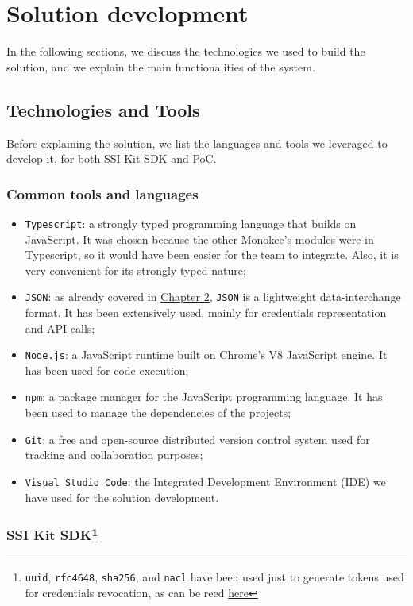 \clearpage
\section{Solution development}
In the following sections, we discuss the technologies we used to build the
solution, and we explain the main functionalities of the system.
\subsection{Technologies and Tools}
Before explaining the solution, we list the languages and tools we leveraged to develop it,
for both SSI Kit SDK and PoC.

\subsubsection{Common tools and languages}
\begin{itemize}
    \setlength\itemsep{-0.1em}
    \item \texttt{Typescript}: a strongly typed programming language that builds 
    on JavaScript. It was chosen because the other Monokee's modules were in 
    Typescript, so it would have been easier for the team to integrate. Also, it is 
    very convenient for its strongly typed nature;
    \item \texttt{JSON}: as already covered in \hyperref[subsubsec:json]{Chapter 2}, 
    \texttt{JSON} is a lightweight data-interchange format. It has been extensively used,
    mainly for credentials representation and API calls;
    \item \texttt{Node.js}: a JavaScript runtime built on Chrome's V8 JavaScript
    engine. It has been used for code execution;
    \item \texttt{npm}: a package manager for the JavaScript programming language.
    It has been used to manage the dependencies of the projects;
    \item \texttt{Git}: a free and open-source distributed version control system
    used for tracking and collaboration purposes;
    \item \texttt{Visual Studio Code}: the Integrated Development Environment (IDE)
    we have used for the solution development.
\end{itemize}

\subsubsection[SSI Kit SDK]{SSI Kit SDK\footnote{\texttt{uuid}, \texttt{rfc4648}, 
\texttt{sha256}, and \texttt{nacl} have been used just to generate tokens used for 
credentials revocation, as can be reed \hyperref[method:isRevoked]{here}}}

